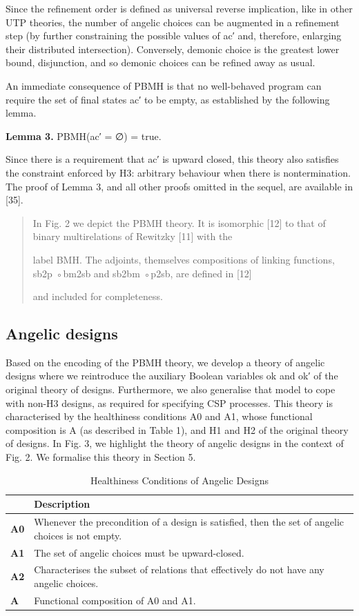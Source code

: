 \documentclass[11pt]{article}
\begin{document}
Since the refinement order is defined as universal reverse implication, like in other UTP theories, the number of angelic choices can be augmented in a refinement step (by further constraining the possible values of ac′ and, therefore, enlarging their distributed intersection). Conversely, demonic choice is the greatest lower bound, disjunction, and so demonic choices can be refined away as usual.

An immediate consequence of PBMH is that no well-behaved program can require the set of final states ac′ to be empty, as established by the following lemma.

\noindent\textbf{Lemma 3.} PBMH(ac′ = ∅) = true.


Since there is a requirement that ac′ is upward closed, this theory also satisfies the constraint enforced by H3: arbitrary behaviour when there is nontermination. The proof of Lemma 3, and all other proofs omitted in the sequel, are available in [35].

\begin{quote}\small\raggedright
In Fig. 2 we depict the PBMH theory. It is isomorphic [12] to that of binary multirelations of Rewitzky [11] with the
\par
label BMH. The adjoints, themselves compositions of linking functions, sb2p ◦bm2sb and sb2bm ◦p2sb, are defined in [12]
\par
and included for completeness.
\end{quote}

\subsection{Angelic designs}
Based on the encoding of the PBMH theory, we develop a theory of angelic designs where we reintroduce the auxiliary Boolean variables ok and ok′ of the original theory of designs. Furthermore, we also generalise that model to cope with non-H3 designs, as required for specifying CSP processes. This theory is characterised by the healthiness conditions A0 and A1, whose functional composition is A (as described in Table 1), and H1 and H2 of the original theory of designs. In Fig. 3, we highlight the theory of angelic designs in the context of Fig. 2. We formalise this theory in Section 5.


\begin{table}[ht]
\centering
\caption{Healthiness Conditions of Angelic Designs}
\begin{tabularx}{0.92\linewidth}{>{\bfseries}l X}
\toprule
 & \textbf{Description} \\
\midrule
A0 & Whenever the precondition of a design is satisfied, then the set of angelic choices is not empty. \\
A1 & The set of angelic choices must be upward-closed. \\
A2 & Characterises the subset of relations that effectively do not have any angelic choices. \\
A  & Functional composition of A0 and A1. \\
\bottomrule
\end{tabularx}
\end{table}
\end{document}
